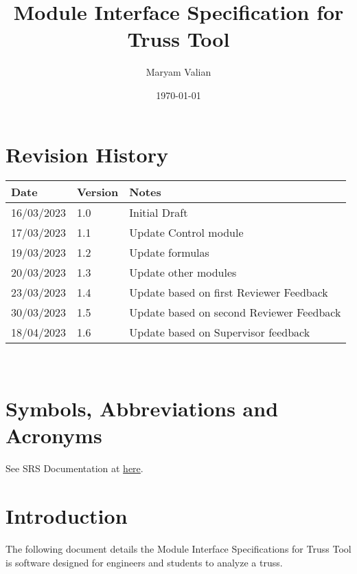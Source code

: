 \documentclass[12pt, titlepage]{article}
\begin{document}
\title{Module Interface Specification for Truss Tool}

\author{Maryam Valian}

\date{\today}

\maketitle


\section{Revision History}

\begin{tabularx}{\textwidth}{p{3cm}p{2cm}X}
\toprule {\bf Date} & {\bf Version} & {\bf Notes}\\
\midrule
16/03/2023 & 1.0 & Initial Draft\\
17/03/2023 & 1.1 & Update Control module\\
19/03/2023 & 1.2 & Update formulas\\
20/03/2023 & 1.3 & Update other modules\\
23/03/2023 & 1.4 & Update based on first Reviewer Feedback\\
30/03/2023 & 1.5 & Update based on second Reviewer Feedback\\
18/04/2023&1.6& Update based on Supervisor feedback\\
\bottomrule
\end{tabularx}

~\newpage

\section{Symbols, Abbreviations and Acronyms}

See SRS Documentation at \href{https://github.com/Maryamvalian/project741/blob/main/docs/SRS/SRS.pdf}{here}. 
\newpage

\tableofcontents

\newpage


\section{Introduction}

The following document details the Module Interface Specifications for
Truss Tool is software designed for engineers and students to analyze a truss.
\end{document}
